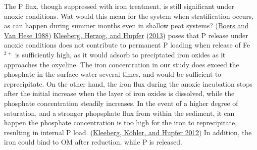 \documentclass[a4paper,11pt]{article}
\begin{document}
The P flux, though suppressed with iron treatment, is still significant under anoxic conditions. Wat would this mean for the system when stratification occurs, as can happen during summer months even in shallow peat systems? (\protect\hyperlink{ref-boersPhosphorusReleasePeaty1988}{Boers and Van Hese 1988}) \protect\hyperlink{ref-kleebergRedoxSensitivityIron2013}{Kleeberg, Herzog, and Hupfer} (\protect\hyperlink{ref-kleebergRedoxSensitivityIron2013}{2013}) poses that P release under anoxic conditions does not contribute to permanent P loading when release of Fe\(^{2+}\) is sufficiently high, as it would adsorb to preciptated iron oxides as it approaches the oxycline. The iron concentration in our study does exceed the phosphate in the surface water several times, and would be sufficient to reprecipitate. On the other hand, the iron flux during the anoxic incubation stops after the initial increase when the layer of iron oxides is dissolved, while the phosphate concentration steadily increases. In the event of a higher degree of saturation, and a stronger phopsphate flux from within the sediment, it can happen the phosphate concentration is too high for the iron to reprecipitate, resulting in internal P load. (\protect\hyperlink{ref-kleebergHowEffectivelyDoes2012}{Kleeberg, Köhler, and Hupfer 2012}) In addition, the iron could bind to OM after reduction, while P is released.
\end{document}
